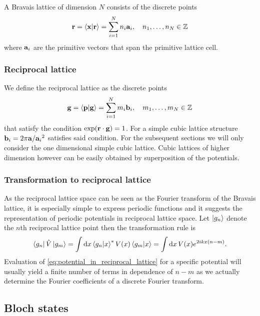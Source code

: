 A Bravais lattice of dimension $N$ consists of the discrete points
\begin{equation}
  \vb{r}
  =\bra{\vb{x}}\ket{\vb{r}}
  =\sum_{i=1}^Nn_i\vb{a}_i
  \qc n_1,\dots,n_N\in\mathbb{Z}
\end{equation}
where $\vb{a}_i$ are the primitive vectors that span the primitive lattice
cell.

\subsubsection{Reciprocal lattice}

We define the reciprocal lattice as the discrete points
\begin{equation}
  \vb{g}
  =\bra{\vb{p}}\ket{\vb{g}}
  =\sum_{i=1}^Nm_i\vb{b}_i
  \qc m_1,\dots,m_N\in\mathbb{Z}
\end{equation}
that satisfy the condition $\exp(\vb{r}\cdot\vb{g})=1$. For a simple cubic
lattice structure $\vb{b}_i=2\pi\vb{a}/{{\vb{a}_i}^2}$ satisfies said
condition. For the subsequent sections we will only consider the one
dimensional simple cubic lattice. Cubic lattices of higher dimension however
can be easily obtained by superposition of the potentials.

\subsubsection{Transformation to reciprocal lattice}

As the reciprocal lattice space can be seen as the Fourier transform of the
Bravais lattice, it is especially simple to express periodic functions and it
suggests the representation of periodic potentials in reciprocal lattice
space. Let $\ket{g_n}$ denote the $n$th reciprocal lattice point then the
transformation rule is
\begin{equation}
  \bra{g_n}\hat{V}\ket{g_m}
  =\int\dd{x}\bra{g_n}\ket{x}^*V(x)\bra{g_m}\ket{x}
  =\int\dd{x}V(x)e^{2ikx(n-m)}
  \label{eq:potential_in_reciprocal_lattice}.
\end{equation}
Evaluation of \cref{eq:potential_in_reciprocal_lattice} for a specific
potential will usually yield a finite number of terms in dependence of
$n-m$ as we actually determine the Fourier coefficients of a discrete Fourier
transform.

\subsection{Bloch states}

